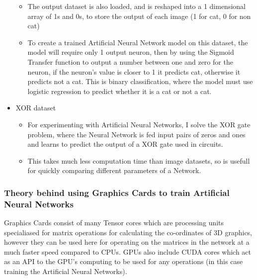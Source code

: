 \documentclass[./project-report/src/latex/project-report.tex]{subfiles}
\begin{document}
\begin{itemize}
\begin{itemize}
        \item The output dataset is also loaded, and is reshaped into a 1 dimensional array of 1s and 0s, to store the output of each image (1 for cat, 0 for non cat)
        \item To create a trained Artificial Neural Network model on this dataset, the model will require only 1 output neuron, then by using the Sigmoid Transfer 
              function to output a number between one and zero for the neuron, if the neuron's value is closer to 1 it predicts cat, otherwise it predicts not a cat. 
              This is binary classification, where the model must use logistic regression to predict whether it is a cat or not a cat.
    \end{itemize}
    \item XOR dataset
    \begin{itemize}
        \item For experimenting with Artificial Neural Networks, I solve the XOR gate problem, where the Neural Network is fed input pairs of zeros and ones and learns 
              to predict the output of a XOR gate used in circuits.
        \item This takes much less computation time than image datasets, so is usefull for quickly comparing different parameters of a Network.
    \end{itemize}
\end{itemize}

\subsubsection{Theory behind using Graphics Cards to train Artificial Neural Networks}
\vspace{5mm}

Graphics Cards consist of many Tensor cores which are processing units specialiased for matrix operations for calculating the co-ordinates of 3D graphics, however they 
can be used here for operating on the matrices in the network at a much faster speed compared to CPUs. GPUs also include CUDA cores which act as an API to the GPU's 
computing to be used for any operations (in this case training the Artificial Neural Networks).
\end{document}
